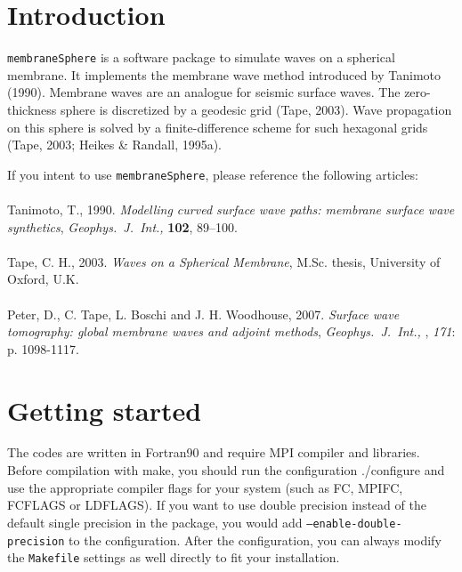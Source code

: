 \documentclass[a4paper,
                          headsepline,
                          listof=totoc,
                          toc=listof,
                          headings=small]{scrreprt} %
\newcommand{\gji}{\textit{Geophys.\ J.\ Int.,} }
\begin{document}

\renewcommand{\contentsname}{Table of Contents}
\tableofcontents

\chapter{Introduction}
\texttt{membraneSphere} is a software package to simulate waves on a spherical
membrane. It implements the membrane wave method introduced by {Tanimoto (1990)}.
Membrane waves are an analogue for seismic surface waves. The zero-thickness
sphere is discretized by a geodesic grid ({Tape}, 2003). Wave propagation on
this sphere is solved by a finite-difference scheme for such
hexagonal grids (Tape, 2003; {Heikes \& Randall}, 1995a).

If you intent to use \texttt{membraneSphere}, please reference the
following articles:
\\
\\
Tanimoto, T., 1990.
\textit{Modelling curved surface wave paths: membrane surface wave synthetics},
\gji \textbf{102}, 89--100.
\\
\\
Tape, C. H., 2003.
\textit{Waves on a Spherical Membrane},
M.Sc. thesis, University of Oxford, U.K.
\\
\\
Peter, D., C. Tape, L. Boschi and J. H. Woodhouse, 2007.
\textit{Surface wave tomography: global membrane waves and adjoint methods},
\textit{\gji}, \textit{171}: p. 1098-1117.\\


\chapter{Getting started}
The codes are written in Fortran90 and require MPI compiler and libraries.
Before compilation with \textsf{make}, you should run the configuration \textsf{./configure}
and use the appropriate compiler flags for your system
(such as \textsf{FC}, \textsf{MPIFC}, \textsf{FCFLAGS} or \textsf{LDFLAGS}).
If you want to use double precision instead of the default single precision
in the package, you would add \texttt{--enable-double-precision} to the configuration.
After the configuration, you can always modify the \texttt{Makefile} settings as well directly to fit your installation.
\end{document}
